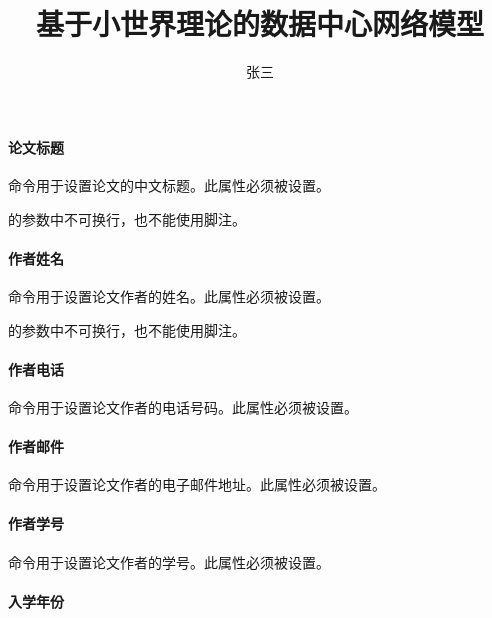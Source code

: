 \paragraph{论文标题}

命令用于设置论文的中文标题。此属性必须被设置。
\begin{tex}
\title{基于小世界理论的数据中心网络模型}
\end{tex}
\begin{note}
的参数中不可换行，也不能使用脚注。
\end{note}

\paragraph{作者姓名}

命令用于设置论文作者的姓名。此属性必须被设置。
\begin{tex}
\author{张三}
\end{tex}
\begin{note}
的参数中不可换行，也不能使用脚注。
\end{note}

\paragraph{作者电话}

命令用于设置论文作者的电话号码。此属性必须被设置。
\begin{tex}
\end{tex}

\paragraph{作者邮件}

命令用于设置论文作者的电子邮件地址。此属性必须被设置。
\begin{tex}
\end{tex}

\paragraph{作者学号}

命令用于设置论文作者的学号。此属性必须被设置。
\begin{tex}
\end{tex}

\paragraph{入学年份}

